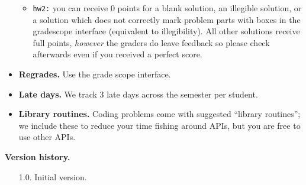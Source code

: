 \documentclass{article}
\theoremstyle{definition}
\theoremstyle{remark}
\begin{document}
\begin{itemize}
\begin{itemize}
        \item
          \texttt{hw2:} you can receive $0$ points for a blank solution, an illegible solution,
          or a solution which does not correctly mark problem parts with boxes in the gradescope
          interface (equivalent to illegibility).
          All other solutions receive full points, \emph{however} the graders do leave feedback
          so please check afterwards even if you received a perfect score.

      \end{itemize}

    \item
      \textbf{Regrades.}  Use the grade scope interface.

    \item
      \textbf{Late days.}
      We track 3 late days across the semester per student.

    \item
      \textbf{Library routines.}
      Coding problems come with suggested ``library routines''; we include these to reduce
      your time fishing around APIs, but you are free to use other APIs.
  \end{itemize}

\noindent\textbf{Version history.}
\begin{enumerate}
    \item[1.0.] Initial version.
\end{enumerate}
\end{document}
